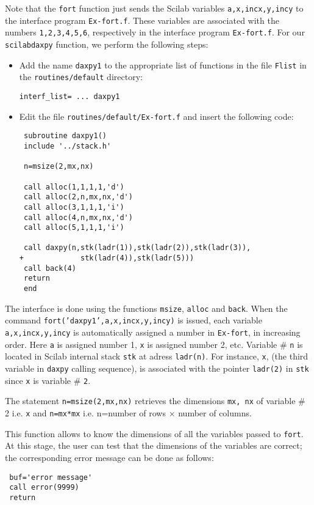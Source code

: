 Note that the {\tt fort} function just sends the Scilab variables
{\tt a,x,incx,y,incy} to the interface program {\tt Ex-fort.f}.
These variables are associated with the numbers {\tt 1,2,3,4,5,6}, 
respectively in the interface program {\tt Ex-fort.f}.
\noindent
For our {\tt scilabdaxpy} function, we perform the following steps:
\begin{itemize}
\item Add the name {\tt daxpy1} to the appropriate list of functions 
in the file {\tt Flist} in the {\tt routines/default} directory:
\begin{verbatim}
interf_list= ... daxpy1
\end{verbatim}
\item Edit the file {\tt routines/default/Ex-fort.f} and
insert the following code:
\begin{verbatim}
 subroutine daxpy1()
 include '../stack.h'

 n=msize(2,mx,nx)

 call alloc(1,1,1,1,'d')
 call alloc(2,n,mx,nx,'d')
 call alloc(3,1,1,1,'i')
 call alloc(4,n,mx,nx,'d')
 call alloc(5,1,1,1,'i')

 call daxpy(n,stk(ladr(1)),stk(ladr(2)),stk(ladr(3)),
+             stk(ladr(4)),stk(ladr(5)))
 call back(4)
 return
 end
\end{verbatim}
\end{itemize}

The interface is done using the functions {\tt msize}, {\tt alloc} and
{\tt back}. When the command {\tt fort('daxpy1',a,x,incx,y,incy)}
is issued, each variable {\tt a,x,incx,y,incy} is automatically
assigned a number in {\tt Ex-fort}, in increasing order.
Here {\tt a} is assigned number 1, {\tt x} is assigned number 2, etc. 
Variable \# {\tt n} is located in Scilab internal stack {\tt stk} at 
adress {\tt ladr(n)}. For instance, {\tt x}, (the third variable in {\tt daxpy}
calling sequence), is associated with the pointer {\tt ladr(2)} in 
{\tt stk} since {\tt x} is variable \# {\tt 2}. 



The statement {\tt n=msize(2,mx,nx)} retrieves the dimensions
{\tt mx, nx} of variable \# 2 i.e. {\tt x} and {\verb!n=mx*mx!} i.e. 
n=number of rows $\times$ number of columns.

 This function allows to
know the dimensions of all the variables passed to {\tt fort}.
At this stage, the user can test that the dimensions of the variables
are correct; the corresponding error message can be done as follows:
\begin{verbatim}
 buf='error message'
 call error(9999)
 return
\end{verbatim}


